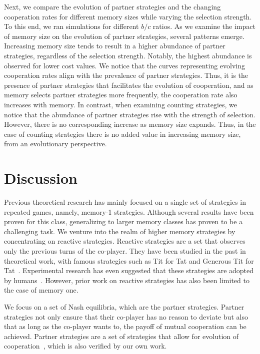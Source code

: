 \documentclass[11pt]{article}
\begin{document}
Next, we compare the evolution of partner strategies and the changing
cooperation rates for different memory sizes while varying the selection
strength. To this end, we ran simulations for different $b/c$ ratios.
As we examine the impact of memory size on the evolution of partner
strategies, several patterns emerge. Increasing memory size tends to result
in a higher abundance of partner strategies, regardless of the selection
strength. Notably, the highest abundance is observed for lower cost values. We
notice that the curves representing evolving cooperation rates align with the
prevalence of partner strategies. Thus, it is the presence of partner strategies
that facilitates the evolution of cooperation, and as memory selects partner
strategies more frequently, the cooperation rate also increases with memory.
In contrast, when examining
counting strategies, we notice that the abundance of partner strategies rise
with the strength of selection. However, there is no corresponding increase as
memory size expands. Thus, in the case of counting strategies there is no added
value in increasing memory size, from an evolutionary perspective.


\section*{Discussion}

Previous theoretical research has mainly focused on a single set of strategies
in repeated games, namely, memory-1 strategies. Although several results have
been proven for this class, generalizing to larger memory classes has proven to
be a challenging task. We venture into the realm of higher memory strategies by
concentrating on reactive strategies. Reactive strategies are a set that
observes only the previous turns of the co-player. They have been studied in the
past in theoretical work, with famous strategies such as Tit for Tat and
Generous Tit for Tat~\cite{nowak:Nature:1993}. Experimental research has even
suggested that these strategies are adopted by humans~\cite{engle:ET:2006,
bruttel:TD:2012}. However, prior work on reactive strategies has also been
limited to the case of memory one.

We focus on a set of Nash equilibria, which are the partner strategies. Partner
strategies not only ensure that their co-player has no reason to deviate but
also that as long as the co-player wants to, the payoff of mutual cooperation
can be achieved. Partner strategies are a set of strategies that
allow for evolution of cooperation~\cite{hilbe:Nature:2018},
which is also verified by our own work.
\end{document}
